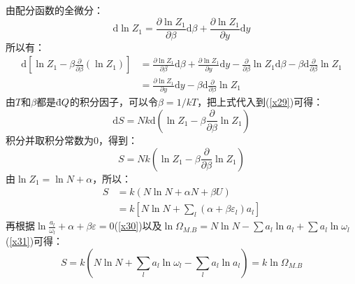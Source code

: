 \documentclass[12pt]{article}
\newcommand \dbar {{\; \bar{} \hspace{-0.3em} \mathrm d}}%
\begin{document}
由配分函数的全微分：
\begin{equation}
	\mathrm{d}\ln Z_1=\frac{\partial \ln Z_1}{\partial \beta}\mathrm{d}\beta +\frac{\partial \ln Z_1}{\partial y}\mathrm{d}y
\end{equation}
所以有：
\begin{equation}
	\begin{split}
	\mathrm{d}[\ln Z_1-\beta \frac{\partial}{\partial \beta}(\ln Z_1)]&=\frac{\partial \ln Z_1}{\partial \beta}\mathrm{d}\beta +\frac{\partial \ln Z_1}{\partial y}\mathrm{d}y-\frac{\partial}{\partial \beta}\ln Z_1\mathrm{d}\beta-\beta \mathrm{d}\frac{\partial}{\partial \beta}\ln Z_1\\
	&=\frac{\partial \ln Z_1}{\partial y}\mathrm{d}y-\beta \mathrm{d}\frac{\partial}{\partial \beta}\ln Z_1
	\end{split}
\end{equation}
由$T$和$\beta$都是$\dbar Q$的积分因子，可以令$\beta=1/kT$，把上式代入到(\ref{x29})可得：
\begin{equation}
	\mathrm{d}S=Nk\mathrm{d}(\ln Z_1-\beta \frac{\partial }{\partial \beta}\ln Z_1)
\end{equation}
积分并取积分常数为0，得到：
\begin{equation}
	S=Nk(\ln Z_1-\beta \frac{\partial }{\partial \beta}\ln Z_1)
\end{equation}
由$\ln Z_1=\ln N+\alpha$，所以：
\begin{equation}
	\begin{split}
		S&=k(N\ln N+\alpha N+\beta U)\\
		&=k[N\ln N+\sum_{l}(\alpha +\beta \varepsilon_l)a_l]
	\end{split}
\end{equation}
再根据$\ln \frac{a_l}{\omega_l}+\alpha+\beta \varepsilon=0$(\ref{x30})以及$\ln \Omega_{M.B}=N\ln N-\sum a_l\ln a_l+\sum a_l\ln \omega_l$(\ref{x31})可得：
\begin{equation}
	S=k(N\ln N+\sum_l a_l\ln \omega_l-\sum_l a_l \ln a_l)=k\ln \Omega_{M.B}
\end{equation}
\end{document}
